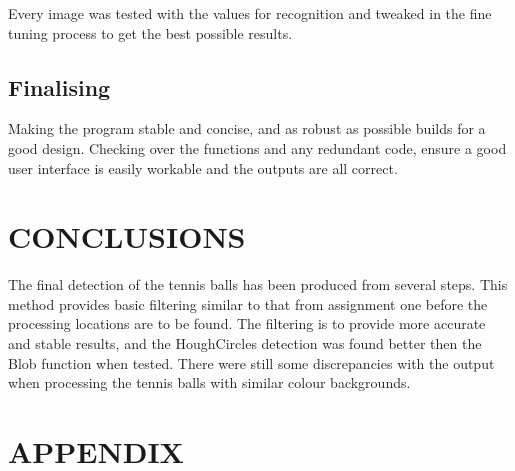 \documentclass[a4paper, 10pt]{article}
\begin{document}
Every image was tested with the values for recognition and tweaked in the fine tuning process to get the best possible results.



\subsection{Finalising}

Making the program stable and concise, and as robust as possible builds for a good design. Checking over the functions and any redundant code, ensure a good user interface is easily workable and the outputs are all correct.


\section{CONCLUSIONS}

The final detection of the tennis balls has been produced from several steps. This method provides basic filtering similar to that from assignment one before the processing locations are to be found. The filtering is to provide more accurate and stable results, and the HoughCircles detection was found better then the Blob function when tested. There were still some discrepancies with the output when processing the tennis balls with similar colour backgrounds.


\nocite{*}




\clearpage
\section*{APPENDIX}
\end{document}
